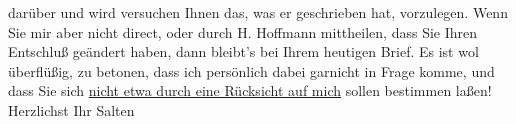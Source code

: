\begin{ledgroupsized}[t]{13cm}
               darüber und wird versuchen Ihnen das, was er geschrieben hat, vorzulegen. Wenn Sie
               mir aber nicht direct, oder durch H. Hoffmann
               mittheilen, dass Sie Ihren Entschluß geändert haben, dann bleibt’s bei Ihrem heutigen
               Brief. \pend
           \pstart
           Es ist wol überflüßig, zu betonen, dass ich persönlich dabei garnicht in Frage komme,
               und dass Sie sich \uline{nicht etwa durch eine Rücksicht auf
                  mich} sollen bestimmen laßen! \pend
           \pstart Herzlichst Ihr \spacefill\mbox{Salten}\pend{}
         
         \endnumbering{}\end{ledgroupsized}\begin{anhang}\end{anhang}\newcommand{\dateiname}{L03406}\newcommand{\titel}{Felix Salten an Arthur Schnitzler, 20. 1. 1905}\newcommand{\editorInnen}{Martin Anton Müller und Laura Untner}
      
